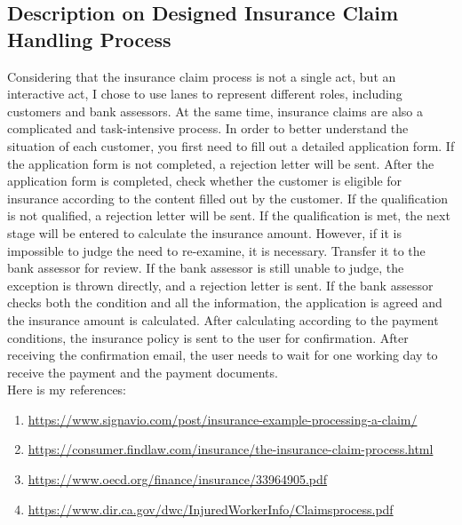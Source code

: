 \documentclass[runningheads]{llncs}
\begin{document}
\subsection{Description on Designed Insurance Claim Handling Process}
Considering that the insurance claim process is not a single act, but an interactive act, I chose to use lanes to represent different roles, including customers and bank assessors. At the same time, insurance claims are also a complicated and task-intensive process. In order to better understand the situation of each customer, you first need to fill out a detailed application form. If the application form is not completed, a rejection letter will be sent. After the application form is completed, check whether the customer is eligible for insurance according to the content filled out by the customer. If the qualification is not qualified, a rejection letter will be sent. If the qualification is met, the next stage will be entered to calculate the insurance amount. However, if it is impossible to judge the need to re-examine, it is necessary. Transfer it to the bank assessor for review. If the bank assessor is still unable to judge, the exception is thrown directly, and a rejection letter is sent. If the bank assessor checks both the condition and all the information, the application is agreed and the insurance amount is calculated. After calculating according to the payment conditions, the insurance policy is sent to the user for confirmation. After receiving the confirmation email, the user needs to wait for one working day to receive the payment and the payment documents.\\ Here is my references:
\begin{enumerate}
    \item \url{https://www.signavio.com/post/insurance-example-processing-a-claim/ }
    \item \url{https://consumer.findlaw.com/insurance/the-insurance-claim-process.html}
    \item \url{https://www.oecd.org/finance/insurance/33964905.pdf}
    \item \url{https://www.dir.ca.gov/dwc/InjuredWorkerInfo/Claimsprocess.pdf}
\end{enumerate}
\end{document}

